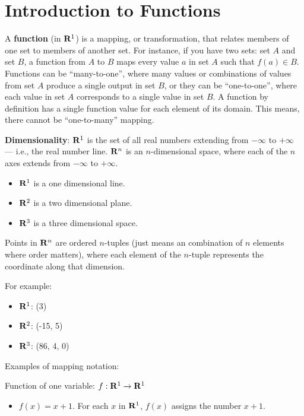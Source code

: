 \documentclass[]{book}
\providecommand{\tightlist}{%
  \setlength{\itemsep}{0pt}\setlength{\parskip}{0pt}}
\theoremstyle{definition}
\theoremstyle{definition}
\theoremstyle{definition}
\theoremstyle{remark}
\begin{document}
\section{Introduction to Functions}\label{introduction-to-functions}

A \textbf{function} (in \({\bf R}^1\)) is a mapping, or transformation,
that relates members of one set to members of another set. For instance,
if you have two sets: set \(A\) and set \(B\), a function from \(A\) to
\(B\) maps every value \(a\) in set \(A\) such that \(f(a) \in B\).
Functions can be ``many-to-one'', where many values or combinations of
values from set \(A\) produce a single output in set \(B\), or they can
be ``one-to-one'', where each value in set \(A\) corresponds to a single
value in set \(B\). A function by definition has a single function value
for each element of its domain. This means, there cannot be
``one-to-many'' mapping.

\textbf{Dimensionality}: \({\bf R}^1\) is the set of all real numbers
extending from \(-\infty\) to \(+\infty\) --- i.e., the real number
line. \({\bf R}^n\) is an \(n\)-dimensional space, where each of the
\(n\) axes extends from \(-\infty\) to \(+\infty\).

\begin{itemize}
\tightlist
\item
  \({\bf R}^1\) is a one dimensional line.
\item
  \({\bf R}^2\) is a two dimensional plane.
\item
  \({\bf R}^3\) is a three dimensional space.
\end{itemize}

Points in \({\bf R}^n\) are ordered \(n\)-tuples (just means an
combination of \(n\) elements where order matters), where each element
of the \(n\)-tuple represents the coordinate along that dimension.

For example:

\begin{itemize}
\tightlist
\item
  \({\bf R}^1\): (3)
\item
  \({\bf R}^2\): (-15, 5)
\item
  \({\bf R}^3\): (86, 4, 0)
\end{itemize}

Examples of mapping notation:

Function of one variable: \(f:{\bf R}^1\to{\bf R}^1\)

\begin{itemize}
\tightlist
\item
  \(f(x)=x+1\). For each \(x\) in \({\bf R}^1\), \(f(x)\) assigns the
  number \(x+1\).
\end{itemize}
\end{document}
